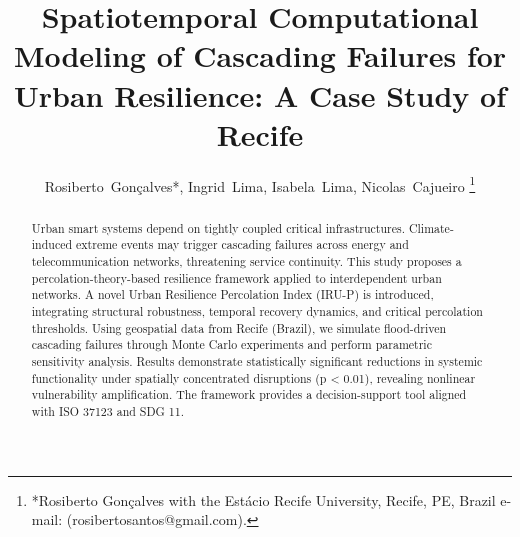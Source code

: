 \documentclass[journal]{IEEEtran}
\begin{document}
%
\title{Spatiotemporal Computational Modeling of Cascading Failures for Urban Resilience: A Case Study of Recife}
%
%
%

\author{Rosiberto~Gonçalves*,
        Ingrid~Lima,
        Isabela~Lima,
        Nicolas~Cajueiro%
\thanks{*Rosiberto Gonçalves with the Estácio Recife University, Recife,
PE, Brazil e-mail: (rosibertosantos@gmail.com).}%
}







\maketitle

\begin{abstract}
Urban smart systems depend on tightly coupled critical infrastructures. Climate-induced extreme events may trigger cascading failures across energy and telecommunication networks, threatening service continuity. This study proposes a percolation-theory-based resilience framework applied to interdependent urban networks. A novel Urban Resilience Percolation Index (IRU-P) is introduced, integrating structural robustness, temporal recovery dynamics, and critical percolation thresholds. Using geospatial data from Recife (Brazil), we simulate flood-driven cascading failures through Monte Carlo experiments and perform parametric sensitivity analysis. Results demonstrate statistically significant reductions in systemic functionality under spatially concentrated disruptions (p < 0.01), revealing nonlinear vulnerability amplification. The framework provides a decision-support tool aligned with ISO 37123 and SDG 11.
\end{abstract}
\end{document}
